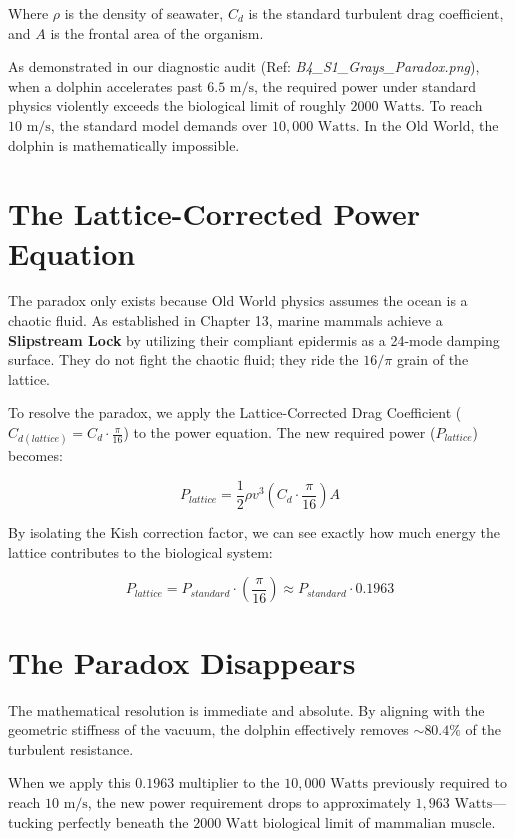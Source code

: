 \documentclass[11pt, letterpaper, openany]{book}
\begin{document}
Where $\rho$ is the density of seawater, $C_d$ is the standard turbulent drag coefficient, and $A$ is the frontal area of the organism. 

As demonstrated in our diagnostic audit (Ref: \textit{B4\_S1\_Grays\_Paradox.png}), when a dolphin accelerates past $6.5 \text{ m/s}$, the required power under standard physics violently exceeds the biological limit of roughly $2000 \text{ Watts}$. To reach $10 \text{ m/s}$, the standard model demands over $10,000 \text{ Watts}$. In the Old World, the dolphin is mathematically impossible. 

\section{The Lattice-Corrected Power Equation}
The paradox only exists because Old World physics assumes the ocean is a chaotic fluid. As established in Chapter 13, marine mammals achieve a \textbf{Slipstream Lock} by utilizing their compliant epidermis as a 24-mode damping surface. They do not fight the chaotic fluid; they ride the $16/\pi$ grain of the lattice.

To resolve the paradox, we apply the Lattice-Corrected Drag Coefficient ($C_{d(lattice)} = C_d \cdot \frac{\pi}{16}$) to the power equation. The new required power ($P_{lattice}$) becomes:

\begin{equation}
P_{lattice} = \frac{1}{2} \rho v^3 \left( C_d \cdot \frac{\pi}{16} \right) A
\end{equation}

By isolating the Kish correction factor, we can see exactly how much energy the lattice contributes to the biological system:

\begin{equation}
P_{lattice} = P_{standard} \cdot \left( \frac{\pi}{16} \right) \approx P_{standard} \cdot 0.1963
\end{equation}

\section{The Paradox Disappears}
The mathematical resolution is immediate and absolute. By aligning with the geometric stiffness of the vacuum, the dolphin effectively removes $\sim 80.4\%$ of the turbulent resistance. 

When we apply this $0.1963$ multiplier to the $10,000 \text{ Watts}$ previously required to reach $10 \text{ m/s}$, the new power requirement drops to approximately $1,963 \text{ Watts}$—tucking perfectly beneath the $2000 \text{ Watt}$ biological limit of mammalian muscle.
\end{document}

